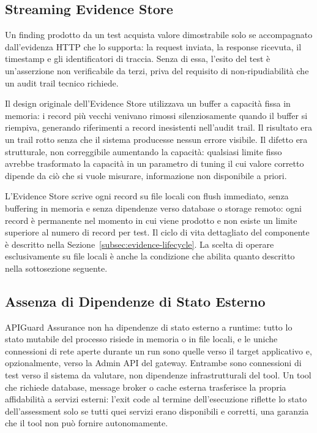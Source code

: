 \subsection{Streaming Evidence Store}\label{subsec:evidence-store}

Un finding prodotto da un test acquista valore dimostrabile solo se accompagnato dall'evidenza \gls{HTTP} che lo supporta: la request inviata, la response ricevuta, il timestamp e gli identificatori di traccia. Senza di essa, l'esito del test è un'asserzione non verificabile da terzi, priva del requisito di non-ripudiabilità che un audit trail tecnico richiede.

Il design originale dell'Evidence Store utilizzava un buffer a capacità fissa in memoria: i record più vecchi venivano rimossi silenziosamente quando il buffer si riempiva, generando riferimenti a record inesistenti nell'audit trail. Il risultato era un trail rotto senza che il sistema producesse nessun errore visibile. Il difetto era strutturale, non correggibile aumentando la capacità: qualsiasi limite fisso avrebbe trasformato la capacità in un parametro di tuning il cui valore corretto dipende da ciò che si vuole misurare, informazione non disponibile a priori.

L'Evidence Store scrive ogni record su file locali con flush immediato, senza buffering in memoria e senza dipendenze verso database o storage remoto: ogni record è permanente nel momento in cui viene prodotto e non esiste un limite superiore al numero di record per test. Il ciclo di vita dettagliato del componente è descritto nella Sezione~\ref{subsec:evidence-lifecycle}. La scelta di operare esclusivamente su file locali è anche la condizione che abilita quanto descritto nella sottosezione seguente.


\subsection{Assenza di Dipendenze di Stato Esterno}\label{subsec:zero-state}

APIGuard Assurance non ha dipendenze di stato esterno a runtime: tutto lo stato mutabile del processo risiede in memoria o in file locali, e le uniche connessioni di rete aperte durante un run sono quelle verso il target applicativo e, opzionalmente, verso la Admin \gls{API} del gateway. Entrambe sono connessioni di test verso il sistema da valutare, non dipendenze infrastrutturali del tool. Un tool che richiede database, message broker o cache esterna trasferisce la propria affidabilità a servizi esterni: l'exit code al termine dell'esecuzione riflette lo stato dell'assessment solo se tutti quei servizi erano disponibili e corretti, una garanzia che il tool non può fornire autonomamente.


